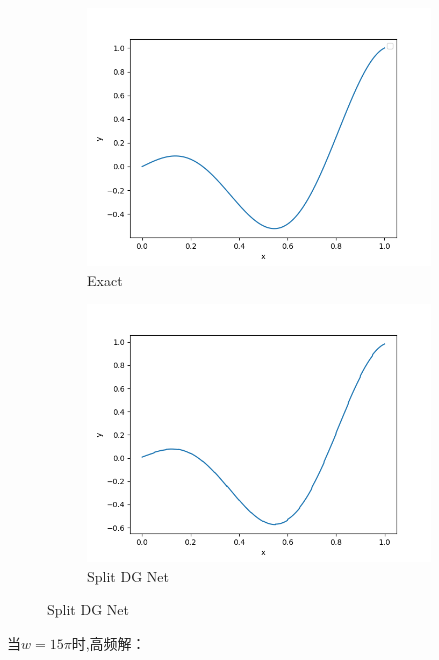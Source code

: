 \begin{figure}[H]
    \centering  
    \begin{subfigure}{0.5\textwidth}  
        \centering  
        \includegraphics[width=0.9\linewidth]{./pics/final/possion/dgnet1d/2piexact.png}  
        \caption{Exact}  
    \end{subfigure}%
    \begin{subfigure}{0.5\textwidth}  
        \centering  
        \includegraphics[width=0.9\linewidth]{./pics/final/possion/dgnet1d/2pi2ltrunk.png}  
        \caption{Split DG Net}
    \end{subfigure}  
\end{figure} 

当$w=15\pi$时,高频解：

